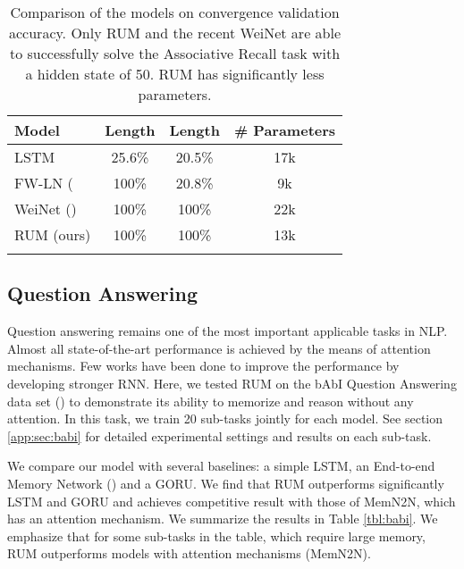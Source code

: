 \documentclass{article} \usepackage{iclr2018_conference,times}
\begin{document}
\begin{table}[h!]
\centering
\begin{tabular}{lcc|c}
\toprule
  Model &   Length  & Length  & \# Parameters\\ 
   \hline 
 LSTM  & 25.6\% & 20.5\% & 17k\\
FW-LN (\cite{ba2016using}   & 100\% & 20.8\%  & 9k\\ 
WeiNet (\cite{zhang2017learning}) & 100\% & 100\%  & 22k\\
RUM (ours) & 100\% & 100\% & 13k \\
\bottomrule \\
\end{tabular}
\caption{Comparison of the models on convergence validation accuracy. Only RUM and the recent WeiNet are able to successfully solve the  Associative Recall task with a hidden state of 50. RUM has significantly less parameters.}
\label{tbl:recall}
\end{table}


\subsection{Question Answering}
Question answering remains one of the most important applicable tasks in NLP. Almost all state-of-the-art performance is achieved by the means of attention mechanisms. Few works have been done to improve the performance by developing stronger RNN. Here, we tested RUM on the bAbI Question Answering data set (\cite{weston2015towards}) to demonstrate its ability to memorize and reason without any attention. In this task, we train 20 sub-tasks jointly for each model. See section \ref{app:sec:babi} for detailed experimental settings and results on each sub-task. 

We compare our model with several baselines: a simple LSTM, an End-to-end Memory Network (\cite{sukhbaatar2015end}) and a GORU. We find that RUM outperforms significantly LSTM and GORU and achieves competitive result with those of MemN2N, which has an attention mechanism. We summarize the results in Table \ref{tbl:babi}. We emphasize that for some sub-tasks in the table, which require large memory, RUM outperforms models with attention mechanisms (MemN2N). 
\end{document}
